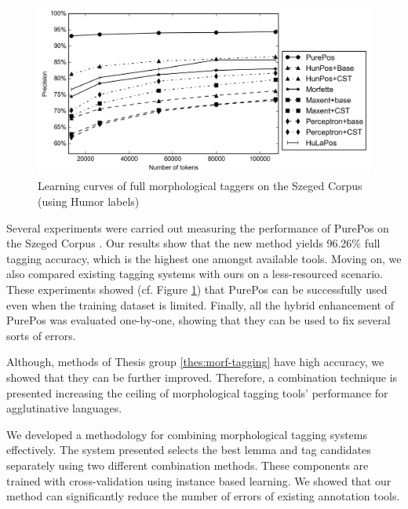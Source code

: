 \begin{figure}[H]
  \centering
  \includegraphics[width=1\textwidth]{MorphTagging/msd_token.png}
  \caption{Learning curves of full morphological taggers on the Szeged Corpus (using Humor labels)}
  \label{fig:humor-token_en}
\end{figure}

Several experiments were carried out measuring the performance of PurePos on the Szeged Corpus \cite{Csendes2004}.
Our results show that the new method yields 96.26\% full tagging accuracy, which is the highest one amongst available tools.
Moving on, we also compared existing tagging systems with ours on a less-resourced scenario.
These experiments showed (cf. Figure \ref{fig:humor-token_en}) that PurePos can be successfully used even when the training dataset is limited.
Finally, all the hybrid enhancement of PurePos was evaluated one-by-one, showing that they can be used to fix several sorts of errors.


\thesisline%

Although, methods of Thesis group \ref{thes:morf-tagging} have high accuracy, we showed that they can be further improved.  
Therefore, a combination technique is presented increasing the ceiling of morphological tagging tools' performance for agglutinative languages.


\begin{core}
\begin{thesis}
We developed a methodology for combining morphological tagging systems effectively.
The system presented selects the best lemma and tag candidates separately using two different combination methods.
These components are trained with cross-validation using instance based learning.
We showed that our method can significantly reduce the number of errors of existing annotation tools.
\end{thesis}

\begin{pub}
\cite{Laki2013a,Orosz2013c,Orosz2013d} 
\end{pub}
\end{core}


